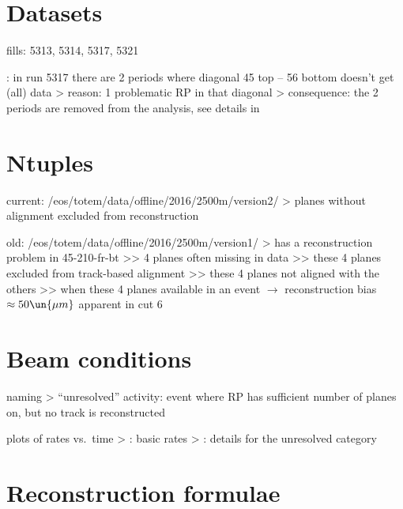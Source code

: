 \section{Datasets}

\> fills: 5313, 5314, 5317, 5321

\> : in run 5317 there are 2 periods where diagonal 45 top -- 56 bottom doesn't get (all) data
\>> reason: 1 problematic RP in that diagonal
\>> consequence: the 2 periods are removed from the analysis, see details in\\ 



\section{Ntuples}

\> current: /eos/totem/data/offline/2016/2500m/version2/
\>> planes without alignment excluded from reconstruction

\> old: /eos/totem/data/offline/2016/2500m/version1/
\>> has a reconstruction problem in 45-210-fr-bt
\>>> 4 planes often missing in data
\>>> these 4 planes excluded from track-based alignment
\>>> these 4 planes not aligned with the others
\>>> when these 4 planes available in an event $\rightarrow$ reconstruction bias $\approx 50\un{\mu m}$ apparent in cut 6


\section{Beam conditions}

\> naming
\>> ``unresolved'' activity: event where RP has sufficient number of planes on, but no track is reconstructed

\> plots of rates vs.~time
\>> : basic rates
\>> : details for the unresolved category

\section{Reconstruction formulae}

